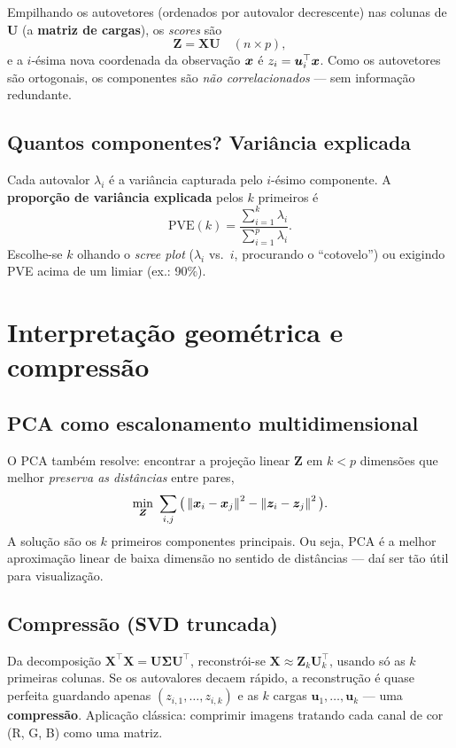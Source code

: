 \documentclass[11pt,a4paper]{article}
\begin{document}
Empilhando os autovetores (ordenados por autovalor decrescente) nas colunas de
$\bm{U}$ (a \textbf{matriz de cargas}), os \emph{scores} são
\[
  \bm{Z} = \bm{X}\bm{U}\quad (n\times p),
\]
e a $i$-ésima nova coordenada da observação $\bm{x}$ é $z_{i}=\bm{u}_i^\top\bm{x}$. Como os
autovetores são ortogonais, os componentes são \emph{não correlacionados} --- sem
informação redundante.

\subsection{Quantos componentes? Variância explicada}
Cada autovalor $\lambda_i$ é a variância capturada pelo $i$-ésimo componente. A
\textbf{proporção de variância explicada} pelos $k$ primeiros é
\begin{equation}\label{eq:pve}
  \text{PVE}(k) = \frac{\sum_{i=1}^k \lambda_i}{\sum_{i=1}^p \lambda_i}.
\end{equation}
Escolhe-se $k$ olhando o \emph{scree plot} ($\lambda_i$ vs.\ $i$, procurando o
``cotovelo'') ou exigindo PVE acima de um limiar (ex.: 90\%).

\section{Interpretação geométrica e compressão}
\subsection{PCA como escalonamento multidimensional}
O PCA também resolve: encontrar a projeção linear $\bm{Z}$ em $k<p$ dimensões que
melhor \emph{preserva as distâncias} entre pares,
\[
  \min_{\bm{Z}}\ \sum_{i,j}\big(\left\lVert \bm{x}_i-\bm{x}_j \right\rVert^2 - \left\lVert \bm{z}_i-\bm{z}_j \right\rVert^2\big).
\]
A solução são os $k$ primeiros componentes principais. Ou seja, PCA é a melhor
aproximação linear de baixa dimensão no sentido de distâncias --- daí ser tão útil
para visualização.

\subsection{Compressão (SVD truncada)}
Da decomposição $\bm{X}^\top\bm{X}=\bm{U}\bm{\Sigma}\bm{U}^\top$, reconstrói-se
$\bm{X}\approx \bm{Z}_k\bm{U}_k^\top$, usando só as $k$ primeiras colunas. Se os
autovalores decaem rápido, a reconstrução é quase perfeita guardando apenas
$(z_{i,1},\dots,z_{i,k})$ e as $k$ cargas $\bm{u}_1,\dots,\bm{u}_k$ --- uma
\textbf{compressão}. Aplicação clássica: comprimir imagens tratando cada canal de
cor (R, G, B) como uma matriz.
\end{document}
